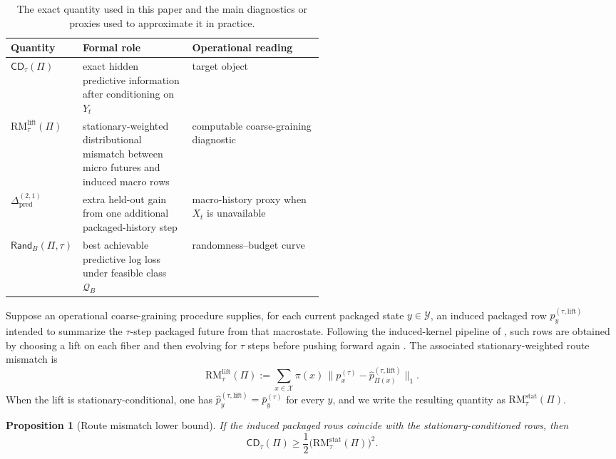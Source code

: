 \documentclass[11pt]{article}
\newtheorem{proposition}[theorem]{Proposition}
\numberwithin{equation}{section}
\begin{document}
\begin{table}[tbp]
\centering
\caption{The exact quantity used in this paper and the main diagnostics or proxies used to approximate it in practice.}
\label{tab:diagnostics}
\small
\setlength{\tabcolsep}{5pt}
\renewcommand{\arraystretch}{1.12}
\begin{tabularx}{0.98\linewidth}{@{}>{\RaggedRight\arraybackslash}p{0.16\linewidth} >{\RaggedRight\arraybackslash}p{0.35\linewidth} >{\RaggedRight\arraybackslash}X@{}}
\toprule
Quantity & Formal role & Operational reading \\
\midrule
$\mathsf{CD}_\tau(\Pi)$ & exact hidden predictive information after conditioning on $Y_t$ & target object \\
$\mathrm{RM}_\tau^{\mathrm{lift}}(\Pi)$ & stationary-weighted distributional mismatch between micro futures and induced macro rows & computable coarse-graining diagnostic \\
$\Delta_{\mathrm{pred}}^{(2,1)}$ & extra held-out gain from one additional packaged-history step & macro-history proxy when $X_t$ is unavailable \\
$\mathsf{Rand}_B(\Pi,\tau)$ & best achievable predictive log loss under feasible class $\mathcal{Q}_B$ & randomness--budget curve \\
\bottomrule
\end{tabularx}
\end{table}

Suppose an operational coarse-graining procedure supplies, for each current packaged state $y \in \mathcal{Y}$, an induced packaged row $\widehat p_y^{(\tau,\mathrm{lift})}$ intended to summarize the $\tau$-step packaged future from that macrostate. Following the induced-kernel pipeline of \citeauthor{tsiokos2026pica}, such rows are obtained by choosing a lift on each fiber and then evolving for $\tau$ steps before pushing forward again \citep{tsiokos2026pica}. The associated stationary-weighted route mismatch is
\begin{equation}
\mathrm{RM}_\tau^{\mathrm{lift}}(\Pi)
:=
\sum_{x \in \mathcal{X}}
\pi(x)\,
\bigl\|
p_x^{(\tau)} - \widehat p_{\Pi(x)}^{(\tau,\mathrm{lift})}
\bigr\|_1.
\label{eq:route-mismatch}
\end{equation}
When the lift is stationary-conditional, one has $\widehat p_y^{(\tau,\mathrm{lift})}=\bar p_y^{(\tau)}$ for every $y$, and we write the resulting quantity as $\mathrm{RM}_\tau^{\mathrm{stat}}(\Pi)$.

\begin{proposition}[Route mismatch lower bound]\label{prop:rm-lower-bound}
If the induced packaged rows coincide with the stationary-conditioned rows, then
\begin{equation}
\mathsf{CD}_\tau(\Pi)
\ge
\frac{1}{2}\bigl(\mathrm{RM}_\tau^{\mathrm{stat}}(\Pi)\bigr)^2.
\label{eq:rm-lower-bound}
\end{equation}
\end{proposition}
\end{document}
